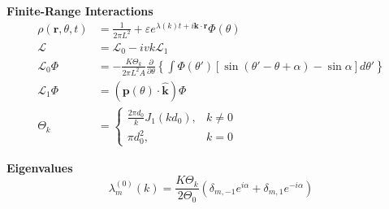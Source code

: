 \documentclass{article}
\begin{document}
\noindent\textbf{Finite-Range Interactions}
\begin{align}
\rho(\mathbf{r},\theta,t) &= \frac{1}{2\pi L^2} + \varepsilon e^{\lambda(k)t + i\mathbf{k}\cdot\mathbf{r}}\Phi(\theta) \\
\mathcal{L} &= \mathcal{L}_0 - ivk\mathcal{L}_1 \\
\mathcal{L}_0\Phi &= -\frac{K\Theta_k}{2\pi L^2 A}\frac{\partial}{\partial\theta}\left\{\int \Phi(\theta')\left[\sin(\theta'-\theta+\alpha) - \sin\alpha\right]d\theta'\right\} \\
\mathcal{L}_1\Phi &= (\mathbf{p}(\theta)\cdot\hat{\mathbf{k}})\Phi \\
\Theta_k &= \begin{cases}
\frac{2\pi d_0}{k}J_1(kd_0), & k \neq 0 \\
\pi d_0^2, & k = 0
\end{cases}
\end{align}

\noindent\textbf{Eigenvalues}
\begin{equation}
\lambda_m^{(0)}(k) = \frac{K\Theta_k}{2\Theta_0}\left(\delta_{m,-1}e^{i\alpha} + \delta_{m,1}e^{-i\alpha}\right)
\end{equation}
\end{document}
